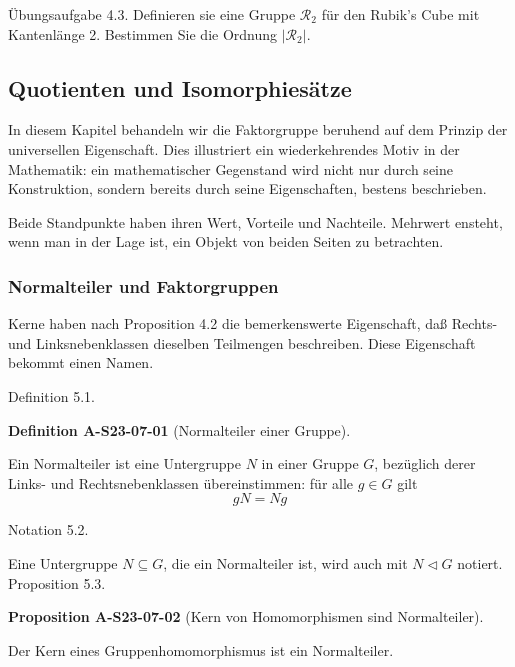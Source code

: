 \documentclass[10pt, letterpaper]{article}
\newcommand{\CustomHeading}[3]{%
  \par\medskip\noindent%
  \textbf{#1 #2} \textnormal{(#3)}.\enskip%
}
\newenvironment{DEF}[2]{\begin{unitbox}\CustomHeading{Definition}{#1}{#2}}{\end{unitbox}}
\newenvironment{PROP}[2]{\begin{unitbox}\CustomHeading{Proposition}{#1}{#2}}{\end{unitbox}}
\begin{document}
Übungsaufgabe 4.3. Definieren sie eine Gruppe $\mathscr{R}_{2}$ für den Rubik's Cube mit Kantenlänge 2. Bestimmen Sie die Ordnung $\left|\mathscr{R}_{2}\right|$.






\pagebreak


\subsection{Quotienten und Isomorphiesätze}


In diesem Kapitel behandeln wir die Faktorgruppe beruhend auf dem Prinzip der universellen Eigenschaft. Dies illustriert ein wiederkehrendes Motiv in der Mathematik: ein mathematischer Gegenstand wird nicht nur durch seine Konstruktion, sondern bereits durch seine Eigenschaften, bestens beschrieben.



Beide Standpunkte haben ihren Wert, Vorteile und Nachteile. Mehrwert ensteht, wenn man in der Lage ist, ein Objekt von beiden Seiten zu betrachten.





\subsubsection{Normalteiler und Faktorgruppen} 



Kerne haben nach Proposition 4.2 die bemerkenswerte Eigenschaft, daß Rechts- und Linksnebenklassen dieselben Teilmengen beschreiben. Diese Eigenschaft bekommt einen Namen.

Definition 5.1. 

\begin{DEF}{A-S23-07-01}{Normalteiler einer Gruppe}
Ein Normalteiler ist eine Untergruppe $N$ in einer Gruppe $G$, bezüglich derer Links- und Rechtsnebenklassen übereinstimmen: für alle $g \in G$ gilt
$$
g N=N g
$$
\end{DEF}

Notation 5.2. 


Eine Untergruppe $N \subseteq G$, die ein Normalteiler ist, wird auch mit $N \triangleleft G$ notiert.\\


Proposition 5.3. 


\begin{PROP}{A-S23-07-02}{Kern von Homomorphismen sind Normalteiler}
Der Kern eines Gruppenhomomorphismus ist ein Normalteiler.
\end{PROP}
\end{document}
